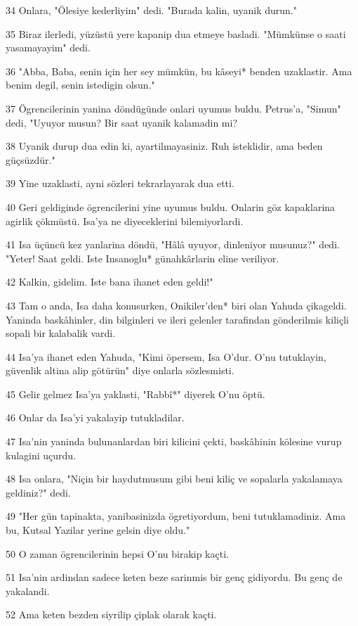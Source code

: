 \par 34 Onlara, "Ölesiye kederliyim" dedi. "Burada kalin, uyanik durun."
\par 35 Biraz ilerledi, yüzüstü yere kapanip dua etmeye basladi. "Mümkünse o saati yasamayayim" dedi.
\par 36 "Abba, Baba, senin için her sey mümkün, bu kâseyi* benden uzaklastir. Ama benim degil, senin istedigin olsun."
\par 37 Ögrencilerinin yanina döndügünde onlari uyumus buldu. Petrus'a, "Simun" dedi, "Uyuyor musun? Bir saat uyanik kalamadin mi?
\par 38 Uyanik durup dua edin ki, ayartilmayasiniz. Ruh isteklidir, ama beden güçsüzdür."
\par 39 Yine uzaklasti, ayni sözleri tekrarlayarak dua etti.
\par 40 Geri geldiginde ögrencilerini yine uyumus buldu. Onlarin göz kapaklarina agirlik çökmüstü. Isa'ya ne diyeceklerini bilemiyorlardi.
\par 41 Isa üçüncü kez yanlarina döndü, "Hâlâ uyuyor, dinleniyor musunuz?" dedi. "Yeter! Saat geldi. Iste Insanoglu* günahkârlarin eline veriliyor.
\par 42 Kalkin, gidelim. Iste bana ihanet eden geldi!"
\par 43 Tam o anda, Isa daha konusurken, Onikiler'den* biri olan Yahuda çikageldi. Yaninda baskâhinler, din bilginleri ve ileri gelenler tarafindan gönderilmis kiliçli sopali bir kalabalik vardi.
\par 44 Isa'ya ihanet eden Yahuda, "Kimi öpersem, Isa O'dur. O'nu tutuklayin, güvenlik altina alip götürün" diye onlarla sözlesmisti.
\par 45 Gelir gelmez Isa'ya yaklasti, "Rabbî*" diyerek O'nu öptü.
\par 46 Onlar da Isa'yi yakalayip tutukladilar.
\par 47 Isa'nin yaninda bulunanlardan biri kilicini çekti, baskâhinin kölesine vurup kulagini uçurdu.
\par 48 Isa onlara, "Niçin bir haydutmusum gibi beni kiliç ve sopalarla yakalamaya geldiniz?" dedi.
\par 49 "Her gün tapinakta, yanibasinizda ögretiyordum, beni tutuklamadiniz. Ama bu, Kutsal Yazilar yerine gelsin diye oldu."
\par 50 O zaman ögrencilerinin hepsi O'nu birakip kaçti.
\par 51 Isa'nin ardindan sadece keten beze sarinmis bir genç gidiyordu. Bu genç de yakalandi.
\par 52 Ama keten bezden siyrilip çiplak olarak kaçti.
